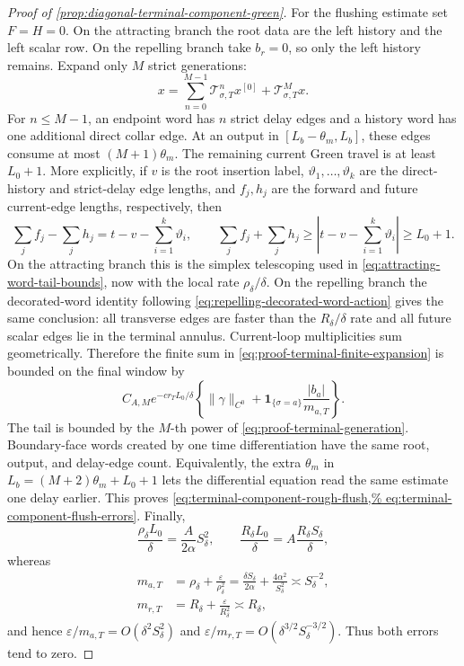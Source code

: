 \begin{proof}[Proof of
\cref{prop:diagonal-terminal-component-green}]
For the flushing estimate set \(F=H=0\).  On the attracting branch the
root data are the left history and the left scalar row.  On the repelling
branch take \(b_r=0\), so only the left history remains.  Expand only
\(M\) strict generations:
\[
 x=\sum_{n=0}^{M-1}\mathscr T_{\sigma,T}^nx^{[0]}
       +\mathscr T_{\sigma,T}^Mx .               \label{eq:proof-terminal-finite-expansion}
\]
For \(n\le M-1\), an endpoint word has \(n\) strict delay edges and a
history word has one additional direct collar edge.  At an output in
\([L_b-\theta_m,L_b]\), these edges consume at most
\((M+1)\theta_m\).  The remaining current Green travel is at least
\(L_0+1\).  More explicitly, if \(v\) is the root insertion label,
\(\vartheta_1,\ldots,\vartheta_k\) are the direct-history and strict-delay
edge lengths, and \(f_j,h_j\) are the forward and future current-edge
lengths, respectively, then
\[
 \sum_jf_j-\sum_jh_j
   =t-v-\sum_{i=1}^k\vartheta_i,
 \qquad
 \sum_jf_j+\sum_jh_j
   \ge\left|t-v-\sum_{i=1}^k\vartheta_i\right|
   \ge L_0+1.
\]
On the attracting branch this is the simplex telescoping used
in \cref{eq:attracting-word-tail-bounds}, now with the local rate
\(\rho_\delta/\delta\).  On the repelling branch the decorated-word
identity following
\cref{eq:repelling-decorated-word-action} gives the same conclusion:
all transverse edges are faster than the \(R_\delta/\delta\) rate and all
future scalar edges lie in the terminal annulus.  Current-loop
multiplicities sum geometrically.  Therefore the finite sum in
\cref{eq:proof-terminal-finite-expansion} is bounded on the final window
by
\[
 C_{A,M}e^{-cr_TL_0/\delta}
 \left\{\|\gamma\|_{C^0}
              +\mathbf1_{\{\sigma=a\}}\frac{|b_a|}{m_{a,T}}\right\}.
\]
The tail is bounded by the \(M\)-th power of
\cref{eq:proof-terminal-generation}.  Boundary-face words created by one
time differentiation have the same root, output, and delay-edge count.
Equivalently, the extra \(\theta_m\) in
\(L_b=(M+2)\theta_m+L_0+1\) lets the differential equation read the same
estimate one delay earlier.  This proves
\cref{eq:terminal-component-rough-flush,%
eq:terminal-component-flush-errors}.
Finally,
\[
 \frac{\rho_\delta L_0}{\delta}
 =\frac{A}{2\alpha}S_\delta^2,\qquad
 \frac{R_\delta L_0}{\delta}
 =A\frac{R_\delta S_\delta}{\delta},
\]
whereas
\begin{align*}
 m_{a,T}
 &=\rho_\delta+\frac{\varepsilon}{\rho_\delta^2}
   =\frac{\delta S_\delta}{2\alpha}
       +\frac{4\alpha^2}{S_\delta^2}
   \asymp S_\delta^{-2},\\
 m_{r,T}
 &=R_\delta+\frac{\varepsilon}{R_\delta^2}
   \asymp R_\delta,
\end{align*}
and hence
\(\varepsilon/m_{a,T}=O(\delta^2S_\delta^2)\) and
\(\varepsilon/m_{r,T}
 =O(\delta^{3/2}S_\delta^{-3/2})\).
Thus both errors tend to zero.


\end{proof}
